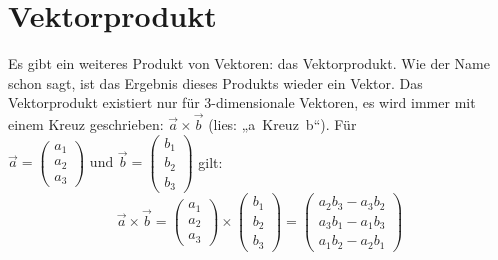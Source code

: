 \documentclass[12pt,a4paper,twoside,fleqn]{article}
\begin{document}
\section{Vektorprodukt}
Es gibt ein weiteres Produkt von Vektoren: das Vektorprodukt. Wie der
Name schon sagt, ist das Ergebnis dieses Produkts wieder ein
Vektor. Das Vektorprodukt existiert nur für 3-dimensionale
Vektoren, es wird immer mit einem Kreuz geschrieben:
$\vec{a}\times\vec{b}$ (lies: „a~Kreuz~b“). Für $ \vec{a} = 
\begin{pmatrix}
  a_1\\a_2\\a_3
\end{pmatrix} \textrm{ und }
\vec{b} = \begin{pmatrix}
  b_1\\b_2\\b_3
\end{pmatrix} $ gilt:
$$\vec{a}\times\vec{b}=
\begin{pmatrix}
  a_1\\a_2\\a_3
\end{pmatrix}
\times
\begin{pmatrix}
  b_1\\b_2\\b_3
\end{pmatrix}
=
\begin{pmatrix}
  a_2b_3-a_3b_2\\
  a_3b_1-a_1b_3\\
  a_1b_2-a_2b_1
\end{pmatrix}
$$
\end{document}
